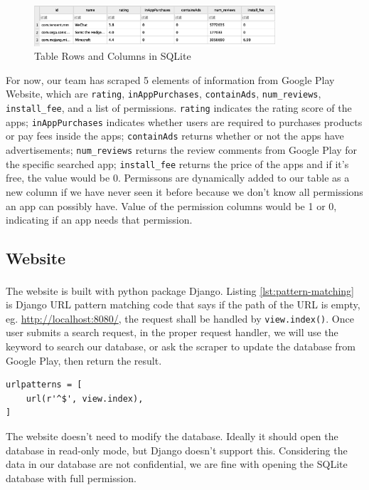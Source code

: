\documentclass[12pt, a4paper]{article}
\newcommand{\code}[1]{\texttt{#1}}
\begin{document}
\begin{figure}[ht]
\centering
\includegraphics[width=0.8\textwidth]{critical_information.png}
\caption{Table Rows and Columns in SQLite}
\label{fig:critical-information}
\end{figure}

For now, our team has scraped 5 elements of information from Google Play Website, which are \code{rating}, \code{inAppPurchases}, \code{containAds}, \code{num\linebreak[4]\_reviews}, \code{install\_fee}, and a list of permissions. \code{rating} indicates the rating score of the apps; \code{inAppPurchases} indicates whether users are required to purchases products or pay fees inside the apps; \code{containAds} returns whether or not the apps have advertisements; \code{num\linebreak[2]\_reviews} returns the review comments from Google Play for the specific searched app; \code{install\_fee} returns the price of the apps and if it’s free, the value would be 0. Permissons are dynamically added to our table as a new column if we have never seen it before because we don't know all permissions an app can possibly have. Value of the permission columns would be 1 or 0, indicating if an app needs that permission.

\subsection{Website}
The website is built with python package Django\textsuperscript{\cite{django}}. Listing \ref{lst:pattern-matching} is Django URL pattern matching code that says if the path of the URL is empty, eg. \url{http://localhost:8080/}, the request shall be handled by \code{view.index()}. Once user submits a search request, in the proper request handler, we will use the keyword to search our database, or ask the scraper to update the database from Google Play, then return the result.

\begin{lstlisting}[frame=tb, caption=urls.py, label=lst:pattern-matching]
urlpatterns = [
    url(r'^$', view.index),
]
\end{lstlisting}

The website doesn't need to modify the database. Ideally it should open the database in read-only mode, but Django doesn't support this. Considering the data in our database are not confidential, we are fine with opening the SQLite database with full permission.
\end{document}
